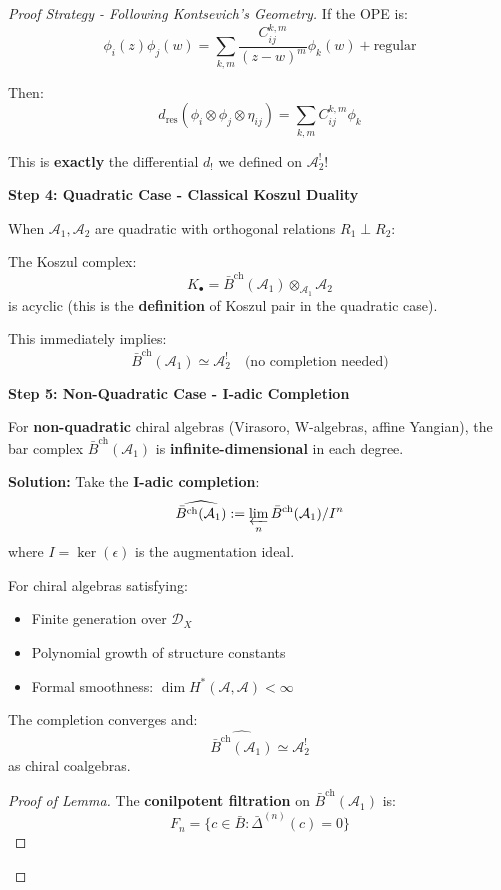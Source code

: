 \begin{proof}[Proof Strategy - Following Kontsevich's Geometry]
If the OPE is:
$$\phi_i(z)\phi_j(w) = \sum_{k,m} \frac{C_{ij}^{k,m}}{(z-w)^m} \phi_k(w) + \text{regular}$$

Then:
$$d_{\text{res}}(\phi_i \otimes \phi_j \otimes \eta_{ij}) = \sum_{k,m} C_{ij}^{k,m} \phi_k$$

This is \textbf{exactly} the differential $d_!$ we defined on $\mathcal{A}_2^!$!

\medskip
\noindent\textbf{Step 4: Quadratic Case - Classical Koszul Duality}

When $\mathcal{A}_1, \mathcal{A}_2$ are quadratic with orthogonal relations $R_1 \perp R_2$:

The Koszul complex:
$$K_\bullet = \bar{B}^{\text{ch}}(\mathcal{A}_1) \otimes_{\mathcal{A}_1} \mathcal{A}_2$$
is acyclic (this is the \textbf{definition} of Koszul pair in the quadratic case).

This immediately implies:
$$\bar{B}^{\text{ch}}(\mathcal{A}_1) \simeq \mathcal{A}_2^! \quad \text{(no completion needed)}$$

\medskip
\noindent\textbf{Step 5: Non-Quadratic Case - I-adic Completion}

For \textbf{non-quadratic} chiral algebras (Virasoro, W-algebras, affine Yangian), the bar complex $\bar{B}^{\text{ch}}(\mathcal{A}_1)$ is \textbf{infinite-dimensional} in each degree.

\textbf{Solution:} Take the \textbf{I-adic completion}:
$$\widehat{\bar{B}^{\text{ch}}(\mathcal{A}_1)} := \varprojlim_n \bar{B}^{\text{ch}}(\mathcal{A}_1)/I^n$$
where $I = \ker(\epsilon)$ is the augmentation ideal.

\begin{lemma}\label{lem:completion-convergence}
For chiral algebras satisfying:
\begin{itemize}
\item Finite generation over $\mathcal{D}_X$
\item Polynomial growth of structure constants
\item Formal smoothness: $\dim H^*(\mathcal{A}, \mathcal{A}) < \infty$
\end{itemize}

The completion converges and:
$$\widehat{\bar{B}^{\text{ch}}(\mathcal{A}_1)} \simeq \mathcal{A}_2^!$$
as chiral coalgebras.
\end{lemma}

\begin{proof}[Proof of Lemma]
The \textbf{conilpotent filtration} on $\bar{B}^{\text{ch}}(\mathcal{A}_1)$ is:
$$F_n = \{c \in \bar{B} : \bar{\Delta}^{(n)}(c) = 0\}$$


\end{proof}
\end{proof}

